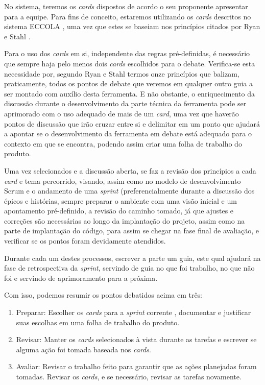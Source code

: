 No sistema, teremos os \textit{cards} dispostos de acordo o seu proponente apresentar para a equipe. Para fins de conceito, estaremos utilizando os \textit{cards} descritos no sistema ECCOLA \cite{ECCOLA}, uma vez que estes se baseiam nos princípios citados por Ryan e Stahl \cite{Ryan2020ArtificialIE}.

Para o uso dos \textit{cards} em si, independente das regras pré-definidas, é necessário que sempre haja pelo menos dois \textit{cards} escolhidos para o debate. Verifica-se esta necessidade por, segundo Ryan e Stahl \cite{Ryan2020ArtificialIE} termos onze princípios que balizam, praticamente, todos os pontos de debate que veremos em qualquer outro guia a ser montado com auxílio desta ferramenta. E não obstante, o enriquecimento da discussão durante o desenvolvimento da parte técnica da ferramenta pode ser aprimorado com o uso adequado de mais de um \textit{card}, uma vez que haverão pontos de discussão que irão cruzar entre si e delimitar em um ponto que ajudará a apontar se o desenvolvimento da ferramenta em debate está adequado para o contexto em que se encontra, podendo assim criar uma folha de trabalho do produto.

Uma vez selecionados e a discussão aberta, se faz a revisão dos princípios a cada \textit{card} e tema percorrido, visando, assim como no modelo de desenvolvimento Scrum e o andamento de uma \textit{sprint} (preferencialmente durante a discussão dos épicos e histórias, sempre preparar o ambiente com uma visão inicial e um apontamento pré-definido, a revisão do caminho tomado, já que ajustes e correções são necessárias ao longo da implantação do projeto, assim como na parte de implantação do código, para assim se chegar na fase final de avaliação, e verificar se os pontos foram devidamente atendidos.

Durante cada um destes processos, escrever a parte um guia, este qual ajudará na fase de retrospectiva da \textit{sprint}, servindo de guia no que foi trabalho, no que não foi e servindo de aprimoramento para a próxima. 

Com isso, podemos resumir os pontos debatidos acima em três:
\begin{enumerate}
    \item Preparar: Escolher os \textit{cards} para a \textit{sprint} corrente , documentar e justificar suas escolhas em uma folha de trabalho do produto. 
    \item Revisar: Manter os \textit{cards} selecionados à vista durante as tarefas e escrever se alguma ação foi tomada baseada nos \textit{cards}.
    \item Avaliar: Revisar o trabalho feito para garantir que as ações planejadas foram tomadas. Revisar os \textit{cards}, e se necessário, revisar as tarefas novamente.
\end{enumerate}

